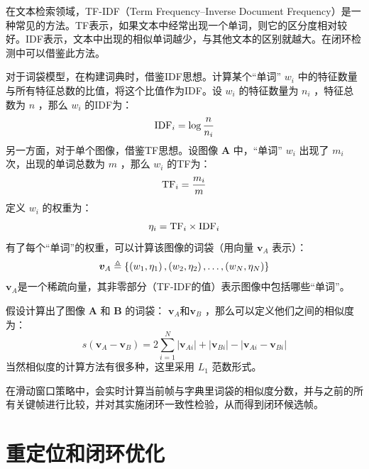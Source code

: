 在文本检索领域，TF-IDF（Term Frequency–Inverse Document Frequency）是一种常见的方法。TF表示，如果文本中经常出现一个单词，则它的区分度相对较好。IDF表示，文本中出现的相似单词越少，与其他文本的区别就越大。在闭环检测中可以借鉴此方法。

对于词袋模型，在构建词典时，借鉴IDF思想。计算某个“单词” $w_i$ 中的特征数量与所有特征总数的比值，将这个比值作为IDF。设 $w_i$ 的特征数量为 $n_i$ ，特征总数为 $n$ ，那么 $w_i$ 的IDF为：
\begin{equation}
\label{eqn:4.29}
\setlength{\abovedisplayskip}{6pt}
\setlength{\belowdisplayskip}{6pt}
\mathrm{IDF}_{i}=\log \frac{n}{n_{i}}
\end{equation}
另一方面，对于单个图像，借鉴TF思想。设图像 $\bm{A} $ 中，“单词” $w_i$ 出现了 $m_i$ 次，出现的单词总数为 $m$ ，那么 $w_i$ 的TF为：
\begin{equation}
\label{eqn:4.30}
\setlength{\abovedisplayskip}{6pt}
\setlength{\belowdisplayskip}{6pt}
\mathrm{TF}_{i}=\frac{m_{i}}{m}
\end{equation}
定义 $w_i$ 的权重为：
\begin{equation}
\label{eqn:4.31}
\setlength{\abovedisplayskip}{6pt}
\setlength{\belowdisplayskip}{6pt}
\eta_{i}=\mathrm{TF}_{i} \times \operatorname{IDF}_{i}
\end{equation}
有了每个“单词”的权重，可以计算该图像的词袋（用向量 $\bm{v}_A $ 表示）：
\begin{equation}
\label{eqn:4.32}
\setlength{\abovedisplayskip}{6pt}
\setlength{\belowdisplayskip}{6pt}
\bm{v}_{A}  \triangleq 
\left\{\left(w_{1}, \eta_{1}\right),\left(w_{2}, \eta_{2}\right), \ldots,\left(w_{N}, \eta_{N}\right)\right\}
\end{equation}
 $\bm{v}_A $是一个稀疏向量，其非零部分（TF-IDF的值）表示图像中包括哪些“单词”。
 
 假设计算出了图像 $\bm{A} $ 和 $\bm{B} $ 的词袋： $\bm{v}_A $和$\bm{v}_B $ ，那么可以定义他们之间的相似度为：
 \begin{equation}
 \label{eqn:4.33}
 s\left(\boldsymbol{v}_{A}-\boldsymbol{v}_{B}\right)=2 \sum_{i=1}^{N}\left|\boldsymbol{v}_{A i}\right|+\left|\boldsymbol{v}_{B i}\right|-\left|\boldsymbol{v}_{A i}-\boldsymbol{v}_{B i}\right|
  \end{equation}
  当然相似度的计算方法有很多种，这里采用 $L_1 $ 范数形式。
  
  在滑动窗口策略中，会实时计算当前帧与字典里词袋的相似度分数，并与之前的所有关键帧进行比较，并对其实施闭环一致性检验，从而得到闭环候选帧。  
\section{重定位和闭环优化}
